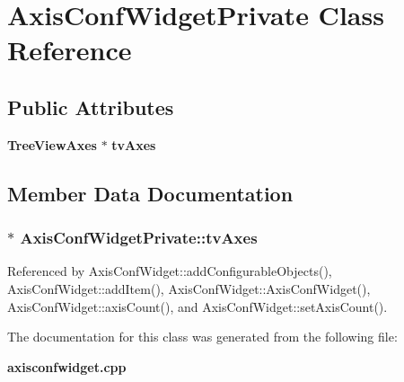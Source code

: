 \section{Axis\+Conf\+Widget\+Private Class Reference}
\label{classAxisConfWidgetPrivate}
\subsection*{Public Attributes}
\begin{DoxyCompactItemize}
\item 
{\bf Tree\+View\+Axes} $\ast$ {\bf tv\+Axes}
\end{DoxyCompactItemize}


\subsection{Member Data Documentation}
\subsubsection[{tv\+Axes}]{$\ast$ Axis\+Conf\+Widget\+Private\+::tv\+Axes}\label{classAxisConfWidgetPrivate_ab9565dde0c0aa60d477b903cfaf37982}


Referenced by Axis\+Conf\+Widget\+::add\+Configurable\+Objects(), Axis\+Conf\+Widget\+::add\+Item(), Axis\+Conf\+Widget\+::\+Axis\+Conf\+Widget(), Axis\+Conf\+Widget\+::axis\+Count(), and Axis\+Conf\+Widget\+::set\+Axis\+Count().



The documentation for this class was generated from the following file\+:\begin{DoxyCompactItemize}
\item 
{\bf axisconfwidget.\+cpp}\end{DoxyCompactItemize}
